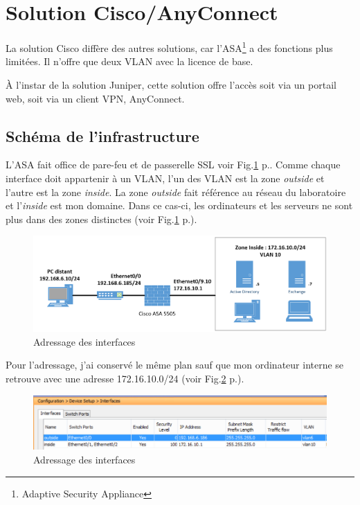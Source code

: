\section{Solution Cisco/AnyConnect}
La solution Cisco diffère des autres solutions, car l'ASA\footnote{Adaptive Security Appliance} a des fonctions plus limitées.
Il n'offre que deux VLAN avec la licence de base.

À l'instar de la solution Juniper, cette solution offre l'accès soit via un portail web, soit via un client VPN, AnyConnect.

\subsection{Schéma de l'infrastructure}
L'ASA fait office de pare-feu et de passerelle SSL voir Fig.\ref{fig:schemaCisco} p.\pageref{fig:schemaCisco}.
Comme chaque interface doit appartenir à un VLAN, l'un des VLAN est la zone \textit{outside} et l'autre est la zone \textit{inside}.
La zone \textit{outside} fait référence au réseau du laboratoire et l'\textit{inside} est mon domaine.
Dans ce cas-ci, les ordinateurs et les serveurs ne sont plus dans des zones distinctes (voir Fig.\ref{fig:schemaCisco} p.\pageref{fig:schemaCisco}).
\begin{figure}[ht]
	\centering
	\includegraphics[width=16cm]{Cisco/schema.png}
	\caption{Adressage des interfaces}
	\label{fig:schemaCisco}
\end{figure}
Pour l'adressage, j'ai conservé le même plan sauf que mon ordinateur interne se retrouve avec une adresse 172.16.10.0/24 (voir Fig.\ref{fig:ifCisco} p.\pageref{fig:ifCisco}).
\begin{figure}[ht]
	\centering
	\includegraphics[width=16cm]{Cisco/interfaces.png}
	\caption{Adressage des interfaces}
	\label{fig:ifCisco}
\end{figure}

